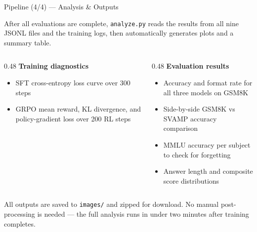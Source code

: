 \documentclass[aspectratio=169,10pt]{beamer}
\begin{document}
\begin{frame}{Pipeline (4/4) — Analysis \& Outputs}

  After all evaluations are complete, \texttt{analyze.py} reads the
  results from all nine JSONL files and the training logs, then
  automatically generates plots and a summary table.

  \vspace{1em}
  \begin{columns}[T]
    \begin{column}{0.48\textwidth}
      \textbf{Training diagnostics}
      \begin{itemize}
        \item SFT cross-entropy loss curve over 300 steps
        \item GRPO mean reward, KL divergence, and policy-gradient
              loss over 200 RL steps
      \end{itemize}
    \end{column}
    \begin{column}{0.48\textwidth}
      \textbf{Evaluation results}
      \begin{itemize}
        \item Accuracy and format rate for all three models on GSM8K
        \item Side-by-side GSM8K vs SVAMP accuracy comparison
        \item MMLU accuracy per subject to check for forgetting
        \item Answer length and composite score distributions
      \end{itemize}
    \end{column}
  \end{columns}

  \vspace{1em}
  \begin{block}{}
    \small
    All outputs are saved to \texttt{images/} and zipped for download.
    No manual post-processing is needed --- the full analysis runs in
    under two minutes after training completes.
  \end{block}

\end{frame}
\end{document}
